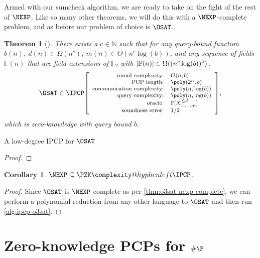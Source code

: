\documentclass[english]{reedthesis}
\makeatletter
\theoremstyle{plain}
\newtheorem{thm}{Theorem}[section]
\newtheorem{cor}[cor]{Corollary}
\theoremstyle{definition}
\theoremstyle{remark}
\DeclarePairedDelimiter{\abs}{\lvert}{\rvert}
\newcommand{\ldipcp}[6]{%
  \ensuremath%
  \mleft[{\footnotesize\begin{array}{r l}
    \text{round complexity:} & #1 \\
    \text{PCP length:} & #2 \\
    \text{communication complexity:} & #3 \\
    \text{query complexity:} & #4 \\
    \text{oracle:} & #5 \\
    \text{soundness error:} & #6
  \end{array}}\mright]%
}
\newcommand{\PZKIPCP}{%
  \PZK\complexity@hyphenleft\IPCP
}
\makeatother
\begin{document}
Armed with our sumcheck algorithm, we are ready to take on the fight of the rest
of $\NEXP$. Like so many other theorems, we will do this with a $\NEXP$-complete
problem, and as before our problem of choice is $\OSAT$.

\begin{thm}[{\cite[Thm.\ 14.2]{CFGS22}}]\label{thm:pzkipcp-for-nexp}
  There exists a $c \in \mathbb{N}$ such that for any query-bound function $b(n)$,
  $d(n) \in \Omega(n^{c})$, $m(n) \in O(n^{c}\log(b))$, and any sequence of fields
  $\mathbb{F}(n)$ that are field extensions of $\mathbb{F}_{2}$ with
  $\abs{\mathbb{F}(n)} \in \Omega((n^{c}\log(b))^{4})$,
  \begin{equation*}
    \OSAT \in \IPCP\ldipcp{O(n, b)}{\poly(2^{n}, b)}{\poly(n, \log(b))}{\poly(n, \log(b))}{\mathbb{F}[X_{1, \ldots, m}^{\le d}]}{1/2},
  \end{equation*}
  which is zero-knowledge with query bound $b$.
\end{thm}

\begin{algorithm}[htbp]
  \caption{A low-degree IPCP for $\OSAT$~\cite[p.\ 15:36]{CFGS22}}\label{alg:ipcp-o3sat}
\end{algorithm}

\begin{proof}
\end{proof}

\begin{cor}\label{nexp-pzkipcp}
  $\NEXP \subseteq \PZKIPCP$.
\end{cor}

\begin{proof}
  Since $\OSAT$ is $\NEXP$-complete as per \cref{thm:o3sat-nexp-complete}, we
  can perform a polynomial reduction from any other language to $\OSAT$ and then
  run \cref{alg:ipcp-o3sat}.
\end{proof}

\chapter{Zero-knowledge PCPs for $\#\P$}\label{chap:zk-pcp-for-hp}
\end{document}
